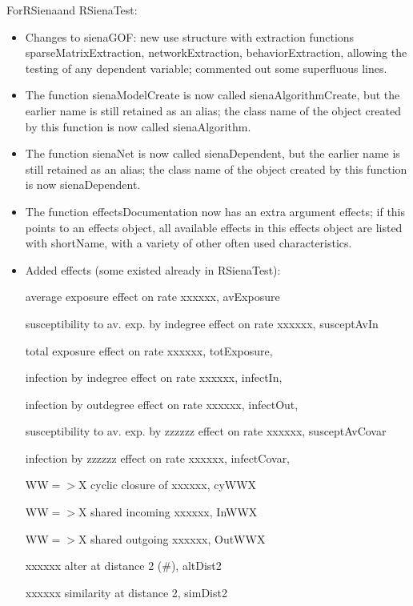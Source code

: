 \documentclass[a4paper,fleqn,11pt]{article}
\newcommand{\+}{\, + \,}
\newcommand{\sfn}[1]{\textsf{#1}}
\begin{document}
\begin{small}
\begin{itemize}
For\textsf{RSiena}and \textsf{RSienaTest}:
  \begin{itemize}
	\item Changes to \textsf{sienaGOF}: new use structure with extraction functions
		\sfn{sparseMatrixExtraction}, \sfn{networkExtraction},
        \sfn{behaviorExtraction},
		allowing the testing of any dependent variable;
		commented out some superfluous lines.
	\item The function \sfn{sienaModelCreate} is now called
        \sfn{sienaAlgorithmCreate},
		but the earlier name is still retained as an alias;
		the class name of the object created by this function is now called
		\sfn{sienaAlgorithm}.
	\item The function \sfn{sienaNet} is now called \sfn{sienaDependent},
		but the earlier name is still retained as an alias;
		the class name of the object created by this function is now
		\textsf{sienaDependent}.
	\item The function \sfn{effectsDocumentation} now has an extra argument
        \sfn{effects};
		if this points to an effects object, all available effects
		in this effects object are listed with \sfn{shortName},
		with a variety of other often used characteristics.
	\item Added effects (some existed already in \sfn{RSienaTest}):

		average exposure effect on rate xxxxxx, \sfn{avExposure}

		susceptibility to av. exp. by indegree effect on rate xxxxxx,
			\sfn{susceptAvIn}

		total exposure effect on rate xxxxxx, \sfn{totExposure},

		infection by indegree effect on rate xxxxxx, \sfn{infectIn},

		infection by outdegree effect on rate xxxxxx, \sfn{infectOut},

		susceptibility to av. exp. by zzzzzz effect on rate xxxxxx,
			\sfn{susceptAvCovar}

		infection by zzzzzz effect on rate xxxxxx, \sfn{infectCovar,}

		WW$=>$X cyclic closure of xxxxxx, \sfn{cyWWX}

		WW$=>$X shared incoming xxxxxx, \sfn{InWWX}

		WW$=>$X shared outgoing xxxxxx, \sfn{OutWWX}

		xxxxxx alter at distance 2 (\#), \sfn{altDist2}

		xxxxxx similarity at distance 2, \sfn{simDist2}


\end{itemize}
\end{itemize}
\end{small}
\end{document}
